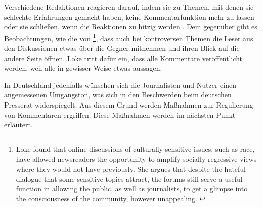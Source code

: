 Verschiedene Redaktionen reagieren darauf, indem sie zu Themen, mit denen sie
schlechte Erfahrungen gemacht haben, keine Kommentarfunktion mehr zu lassen oder
sie schließen, wenn die Reaktionen zu hitzig werden
\autocite[S.~4]{santana:2014}. Dem gegenüber gibt es Beobachtungen, wie die von
\textcite{loke}\footnote{\glqq Loke found that online discussions of culturally
sensitive issues, such as race, have allowed newsreaders the opportunity to
amplify socially regressive views where they would not have previously. She
argues that despite the hateful dialogue that some sensitive topics attract, the
forums still serve a useful function in allowing the public, as well as
journalists, to get a glimpse into the consciousness of the community, however
unappealing.\grqq\- \autocite[S.~12]{santana:2014}}, dass auch bei kontroversen
Themen die Leser aus den Diskussionen etwas über die Gegner mitnehmen und ihren
Blick auf die andere Seite öffnen. Loke tritt dafür ein, dass alle Kommentare
veröffentlicht werden, weil alle in gewisser Weise etwas aussagen.

In Deutschland jedenfalls wünschen sich die Journalisten und Nutzer einen
angemessenen Umgangston, was sich in den Beschwerden beim deutschen Presserat
widerspiegelt. Aus diesem Grund werden Maßnahmen zur Regulierung von Kommentaren
ergriffen. Diese Maßnahmen werden im nächsten Punkt erläutert.

